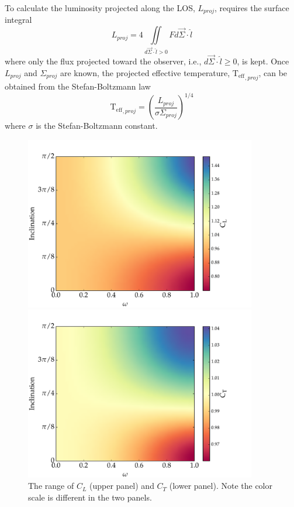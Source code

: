 \documentclass[12pt]{article}
\newcommand{\Teff}{\mathrm{T_{eff}}}
\begin{document}
To calculate the luminosity projected along the LOS, $L_{proj}$, requires the
surface integral
\begin{equation}\label{eq:lproj}
  L_{proj} = 4 \iint \limits_{d\vec{\Sigma} \cdot \hat{l} > 0} F d\vec{\Sigma} \cdot \hat{l}
\end{equation}
where only the flux projected toward the observer,
i.e., $d\vec{\Sigma} \cdot \hat{l} \geq 0$, is kept.
Once $L_{proj}$ and $\Sigma_{proj}$ are known, the projected effective temperature,
$\Teff_{,proj}$, can be obtained from the Stefan-Boltzmann law
\begin{equation}
\Teff_{,proj} = \left( \frac{L_{proj}}{\sigma \Sigma_{proj}} \right)^{1/4}
\end{equation}
where $\sigma$ is the Stefan-Boltzmann constant.

\begin{figure}
  \centering
  \includegraphics[width=0.9\textwidth]{../plots/C_L.pdf}
  
  \includegraphics[width=0.9\textwidth]{../plots/C_T.pdf}
  
  \caption{The range of $C_L$ (upper panel) and $C_T$ (lower panel). Note the
    color scale is different in the two panels. \label{fig:coeff}}
\end{figure}
\end{document}
